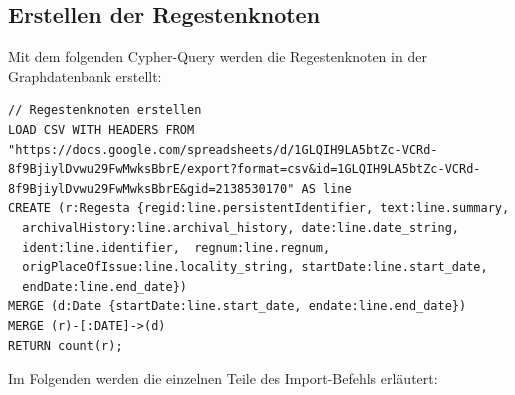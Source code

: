 \documentclass[ngerman,]{scrreprt}
\begin{document}
\hypertarget{erstellen-der-regestenknoten}{%
\subsection{Erstellen der Regestenknoten}\label{erstellen-der-regestenknoten}}

Mit dem folgenden Cypher-Query werden die Regestenknoten in der Graphdatenbank erstellt:

\begin{verbatim}
// Regestenknoten erstellen
LOAD CSV WITH HEADERS FROM "https://docs.google.com/spreadsheets/d/1GLQIH9LA5btZc-VCRd-8f9BjiylDvwu29FwMwksBbrE/export?format=csv&id=1GLQIH9LA5btZc-VCRd-8f9BjiylDvwu29FwMwksBbrE&gid=2138530170" AS line
CREATE (r:Regesta {regid:line.persistentIdentifier, text:line.summary,
  archivalHistory:line.archival_history, date:line.date_string,  
  ident:line.identifier,  regnum:line.regnum,
  origPlaceOfIssue:line.locality_string, startDate:line.start_date,
  endDate:line.end_date})
MERGE (d:Date {startDate:line.start_date, endate:line.end_date})
MERGE (r)-[:DATE]->(d)
RETURN count(r);
\end{verbatim}

Im Folgenden werden die einzelnen Teile des Import-Befehls erläutert:
\end{document}
